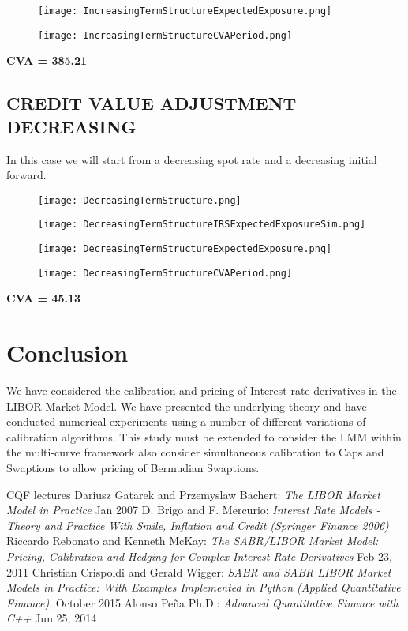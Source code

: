 \documentclass[11pt]{article}
\numberwithin{equation}{subsection}
\begin{document}
\begin{figure}[H]
	\texttt{[image: IncreasingTermStructureExpectedExposure.png]}
\end{figure}
\begin{figure}[H]
	\texttt{[image: IncreasingTermStructureCVAPeriod.png]}
\end{figure}

\textbf{CVA = 385.21}

\subsection{CREDIT VALUE ADJUSTMENT DECREASING}
In this case we will start from a decreasing spot rate and a decreasing initial forward.


\begin{figure}[H]
	\texttt{[image: DecreasingTermStructure.png]}
\end{figure}

\begin{figure}[H]
	\texttt{[image: DecreasingTermStructureIRSExpectedExposureSim.png]}
\end{figure}


\begin{figure}[H]
	\texttt{[image: DecreasingTermStructureExpectedExposure.png]}
\end{figure}

\begin{figure}[H]
	\texttt{[image: DecreasingTermStructureCVAPeriod.png]}
\end{figure}
\textbf{CVA = 45.13}

\section{Conclusion}
We have considered the calibration and pricing of Interest rate derivatives in the LIBOR Market
Model. We have presented the underlying theory and have conducted
numerical experiments using a number of different variations of calibration algorithms. This study must be extended to consider the LMM within the multi-curve framework also consider simultaneous calibration to Caps and Swaptions to allow pricing of Bermudian Swaptions.

\newpage
{\small
\begin{thebibliography}{99}
	  CQF lectures 
	  Dariusz Gatarek and Przemyslaw Bachert: 
	\emph{The LIBOR Market Model in Practice} Jan 2007
	 D. Brigo and F. Mercurio: 
	\emph{Interest Rate Models - Theory and Practice With Smile, Inflation and Credit (Springer Finance 2006)}
	 Riccardo Rebonato and Kenneth McKay: 
	\emph{The SABR/LIBOR Market Model: Pricing, Calibration and Hedging for Complex Interest-Rate Derivatives} Feb 23, 2011	 Christian Crispoldi and Gerald Wigger:
	\emph{SABR and SABR LIBOR Market Models in Practice: With Examples Implemented in Python (Applied Quantitative Finance)}, October 2015
	 Alonso Pe\~{n}a Ph.D.:
	\emph{Advanced Quantitative Finance with C++} Jun 25, 2014		 
\end{thebibliography}
}
\end{document}
